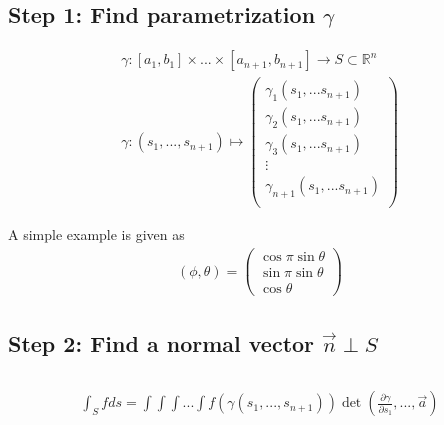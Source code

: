 \documentclass{article}
\begin{document}
\subsection{Step 1: Find parametrization $\gamma$}
\begin{align*}
	\gamma :[a_1,b_1]\times ... \times [a_{n+1},b_{n+1}] \rightarrow S \subset \mathbb{R}^n \\
	\gamma: (s_1,...,s_{n+1}) \mapsto \begin{pmatrix}
	\gamma_1(s_1,...s_{n+1})\\
	\gamma_2(s_1,...s_{n+1})\\
	\gamma_3(s_1,...s_{n+1})\\
	\vdots \\
	\gamma_{n+1}(s_1,...s_{n+1})\\
	\end{pmatrix} 
\end{align*}

\begin{tcolorbox}[colback=blue!20!white]
A simple example is given as
\begin{align*}
(\phi, \theta) = \begin{pmatrix}
	\cos \pi \sin \theta\\
	\sin \pi \sin \theta\\
	\cos \theta
\end{pmatrix}
\end{align*}
\end{tcolorbox}
\subsection{Step 2: Find a normal vector $\vec{n}\perp S$}
\subsection{}
\begin{align*}
	\int_S f ds = \int \int \int ...\int f(\gamma(s_1,...,s_{n+1})) \det(\frac{\partial \gamma}{\partial s_1},...,\vec{a})
\end{align*}
\end{document}
